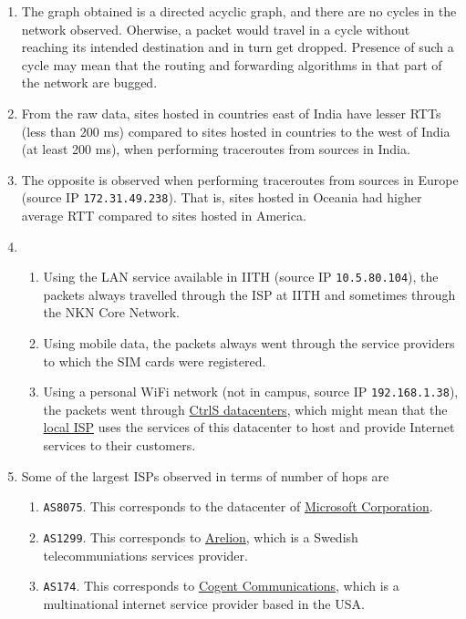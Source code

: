 \documentclass[journal,12pt,twocolumn]{IEEEtran}
\begin{document}
\begin{enumerate}
     \item The graph obtained is a directed acyclic graph, and there are no
     cycles in the network observed. Oherwise, a packet would travel in a cycle
     without reaching its intended destination and in turn get dropped. Presence
     of such a cycle may mean that the routing and forwarding algorithms in that
     part of the network are bugged.
     \item From the raw data, sites hosted in countries east of India have
     lesser RTTs (less than 200 ms) compared to sites hosted in countries to the
     west of India (at least 200 ms), when performing traceroutes from sources
     in India.
     \item The opposite is observed when performing traceroutes from sources in
     Europe (source IP \texttt{172.31.49.238}). That is, sites hosted in Oceania
     had higher average RTT compared to sites hosted in America.
     \item 
     \begin{enumerate}
          \item Using the LAN service available in IITH (source IP
          \texttt{10.5.80.104}), the packets always travelled through the ISP at
          IITH and sometimes through the NKN Core Network.
          \item Using mobile data, the packets always went through the service
          providers to which the SIM cards were registered.
          \item Using a personal WiFi network (not in campus, source IP
          \texttt{192.168.1.38}), the packets went through
          \href{https://www.ctrls.in/}{CtrlS datacenters}, which might mean that
          the \href{https://reachtele.net/}{local ISP} uses the services of this
          datacenter to host and provide Internet services to their customers.
     \end{enumerate}
     \item Some of the largest ISPs observed in terms of number of hops are 
     \begin{enumerate}
          \item \texttt{AS8075}. This corresponds to the datacenter of
          \href{https://www.microsoft.com/en-in}{Microsoft Corporation}.
          \item \texttt{AS1299}. This corresponds to
          \href{https://www.arelion.com/}{Arelion}, which is a Swedish
          telecommuniations services provider.
          \item \texttt{AS174}. This corresponds to
          \href{https://www.cogentco.com/en/}{Cogent Communications}, which is a
          multinational internet service provider based in the USA.
     \end{enumerate}
\end{enumerate}
\end{document}
